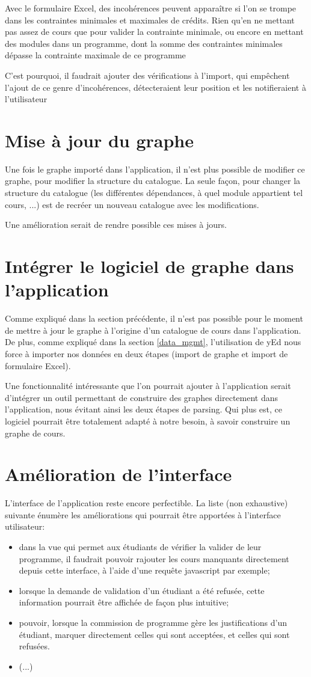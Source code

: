 Avec le formulaire Excel, des incohérences peuvent apparaître si l'on se trompe dans les contraintes minimales et maximales de crédits. Rien qu'en ne mettant pas assez de cours que pour valider la contrainte minimale, ou encore en mettant des modules dans un programme, dont la somme des contraintes minimales dépasse la contrainte maximale de ce programme

C'est pourquoi, il faudrait ajouter des vérifications à l'import, qui empêchent l'ajout de ce genre d'incohérences, détecteraient leur position et les notifieraient  à l'utilisateur

\section{Mise à jour du graphe}
Une fois le graphe importé dans l'application, il n'est plus possible de modifier ce graphe, pour modifier la structure du catalogue. La seule façon, pour changer la structure du catalogue (les différentes dépendances, à quel module appartient tel cours, ...) est de recréer un nouveau catalogue avec les modifications.

Une amélioration serait de rendre possible ces mises à jours.

\section{Intégrer le logiciel de graphe dans l'application}
Comme expliqué dans la section précédente, il n'est pas possible pour le moment de mettre à jour le graphe à l'origine d'un catalogue de cours dans l'application. De plus, comme expliqué dans la section \ref{data_mgmt}, l'utilisation de yEd nous force à importer nos données en deux étapes (import de graphe et import de formulaire Excel).

Une fonctionnalité intéressante que l'on pourrait ajouter à l'application serait d'intégrer un outil permettant de construire des graphes directement dans l'application, nous évitant ainsi les deux étapes de parsing. Qui plus est, ce logiciel pourrait être totalement adapté à notre besoin, à savoir construire un graphe de cours.    
\section{Amélioration de l'interface} 
L'interface de l'application reste encore perfectible. La liste (non exhaustive) suivante énumère les améliorations qui pourrait être apportées à l'interface utilisateur:
\begin{itemize}
\item dans la vue qui permet aux étudiants de vérifier la valider de leur programme, il faudrait pouvoir rajouter les cours manquants directement depuis cette interface, à l'aide d'une requête javascript par exemple;
\item lorsque la demande de validation d'un étudiant a été refusée, cette information pourrait être affichée de façon plus intuitive;
\item pouvoir, lorsque la commission de programme gère les justifications d'un étudiant, marquer directement celles qui sont acceptées, et celles qui sont refusées.
\item (...)
\end{itemize}
